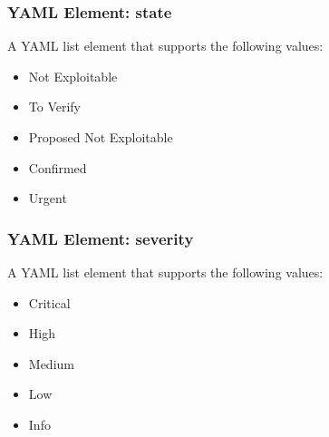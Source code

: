 \subsubsection{YAML Element: state }\label{sec:yaml-exclusions-state}
A YAML list element that supports the following values:

\begin{itemize}
  \item Not Exploitable
  \item To Verify
  \item Proposed Not Exploitable
  \item Confirmed
  \item Urgent
\end{itemize}



\subsubsection{YAML Element: severity}\label{sec:yaml-exclusions-severity}
A YAML list element that supports the following values:

\begin{itemize}
  \item Critical
  \item High
  \item Medium
  \item Low
  \item Info
\end{itemize}


